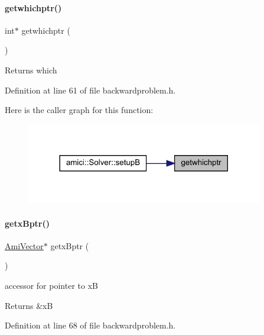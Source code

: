 \paragraph{\texorpdfstring{getwhichptr()}{getwhichptr()}}
{\footnotesize\ttfamily int$\ast$ getwhichptr (\begin{DoxyParamCaption}{ }\end{DoxyParamCaption})}

\begin{DoxyReturn}{Returns}
which 
\end{DoxyReturn}


Definition at line 61 of file backwardproblem.\+h.

Here is the caller graph for this function\+:
\nopagebreak
\begin{figure}[H]
\begin{center}
\leavevmode
\includegraphics[width=293pt]{classamici_1_1_backward_problem_a209a0d59a5a5eebfba1e6db5cb209132_icgraph}
\end{center}
\end{figure}
\mbox{\label{classamici_1_1_backward_problem_afd910c853cb52a19b17ff8b65832fe2e}} 
\paragraph{\texorpdfstring{getxBptr()}{getxBptr()}}
{\footnotesize\ttfamily \mbox{\hyperlink{classamici_1_1_ami_vector}{Ami\+Vector}}$\ast$ getx\+Bptr (\begin{DoxyParamCaption}{ }\end{DoxyParamCaption})}

accessor for pointer to xB \begin{DoxyReturn}{Returns}
\&xB 
\end{DoxyReturn}


Definition at line 68 of file backwardproblem.\+h.

